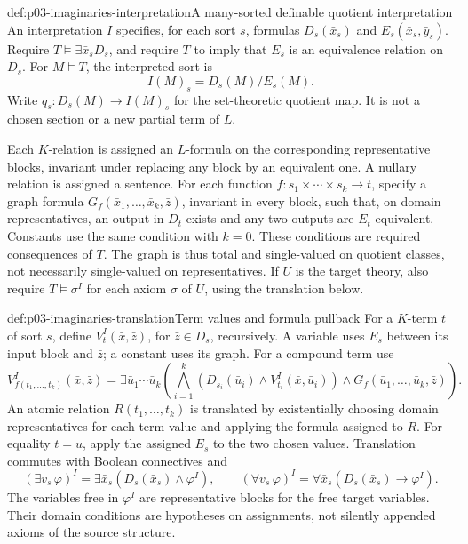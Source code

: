\begin{hbdefinition}{def:p03-imaginaries-interpretation}{A many-sorted definable quotient interpretation}
An interpretation \(I\) specifies, for each sort \(s\), formulas
\(D_s(\bar x_s)\) and \(E_s(\bar x_s,\bar y_s)\). Require
\(T\models\exists\bar x_s D_s\), and require \(T\) to imply that
\(E_s\) is an equivalence relation on \(D_s\).
For \(M\models T\), the interpreted sort is
\[
             I(M)_s=D_s(M)/E_s(M).
\]
Write \(q_s:D_s(M)\to I(M)_s\) for the set-theoretic quotient map.
It is not a chosen section or a new partial term of \(L\).

Each \(K\)-relation is assigned an \(L\)-formula on the corresponding
representative blocks, invariant under replacing any block by an equivalent
one. A nullary relation is assigned a sentence. For each function
\(f:s_1\times\cdots\times s_k\to t\), specify a graph formula
\(G_f(\bar x_1,\ldots,\bar x_k,\bar z)\), invariant in every block,
such that, on domain representatives, an output in \(D_t\) exists and any
two outputs are \(E_t\)-equivalent. Constants use the same condition with
\(k=0\). These conditions are required consequences of \(T\).
The graph is thus total and single-valued on quotient classes, not necessarily
single-valued on representatives. If \(U\) is the target theory, also require
\(T\models\sigma^I\) for each axiom \(\sigma\) of \(U\), using the
translation below.
\end{hbdefinition}

\begin{hbdefinition}{def:p03-imaginaries-translation}{Term values and formula pullback}
For a \(K\)-term \(t\) of sort \(s\), define
\(V_t^I(\bar x,\bar z)\), for \(\bar z\in D_s\), recursively.
A variable uses \(E_s\) between its input block and \(\bar z\);
a constant uses its graph. For a compound term use
\[
 V_{f(t_1,\ldots,t_k)}^I(\bar x,\bar z)
 =\exists\bar u_1\cdots\bar u_k
 \left(\bigwedge_{i=1}^k
       (D_{s_i}(\bar u_i)\land V_{t_i}^I(\bar x,\bar u_i))
       \land G_f(\bar u_1,\ldots,\bar u_k,\bar z)\right).
\]
An atomic relation \(R(t_1,\ldots,t_k)\) is translated by existentially
choosing domain representatives for each term value and applying the formula
assigned to \(R\). For equality \(t=u\), apply the assigned \(E_s\)
to the two chosen values. Translation commutes with Boolean connectives and
\[
 (\exists v_s\,\varphi)^I
   =\exists\bar x_s(D_s(\bar x_s)\land\varphi^I),\qquad
 (\forall v_s\,\varphi)^I
   =\forall\bar x_s(D_s(\bar x_s)\to\varphi^I).
\]
The variables free in \(\varphi^I\) are representative blocks for the
free target variables. Their domain conditions are hypotheses on assignments,
not silently appended axioms of the source structure.
\end{hbdefinition}

